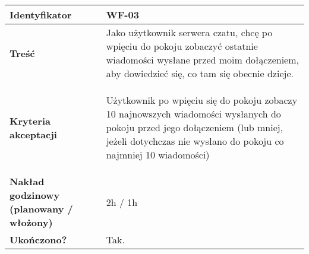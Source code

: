 \begin{tabular}{ | l | l | }
	\hline
		\textbf{Identyfikator} &
		WF-03
		\\

	\hline
		\textbf{Treść} & \parbox[t]{11.5cm}{\strut
			Jako użytkownik serwera czatu, chcę po wpięciu
			do pokoju zobaczyć ostatnie wiadomości wysłane
			przed moim dołączeniem, aby dowiedzieć się, co
			tam się obecnie dzieje.
		\strut}\\

	\hline
		\parbox[t]{4cm}{\textbf{Kryteria akceptacji}} & \parbox[t]{11.5cm}{\strut
			\begin{enumreq}
				\item Użytkownik po wpięciu się do pokoju zobaczy
				10 najnowszych wiadomości wysłanych do pokoju
				przed jego dołączeniem (lub mniej, jeżeli
				dotychczas nie wysłano do pokoju co najmniej
				10 wiadomości)
			\end{enumreq}
			\strut}
		\\

    \hline
      \parbox[t]{4cm}{\textbf{Nakład godzinowy (planowany / włożony)}} &
      \parbox[t]{11.5cm}{\strut
        2h / 1h
      \strut}\\

  \hline
    \parbox[t]{4cm}{\textbf{Ukończono?}} &
    \parbox[t]{11.5cm}{\strut
      Tak.
    \strut}\\

    \hline
\end{tabular}

\vspace{1em}

